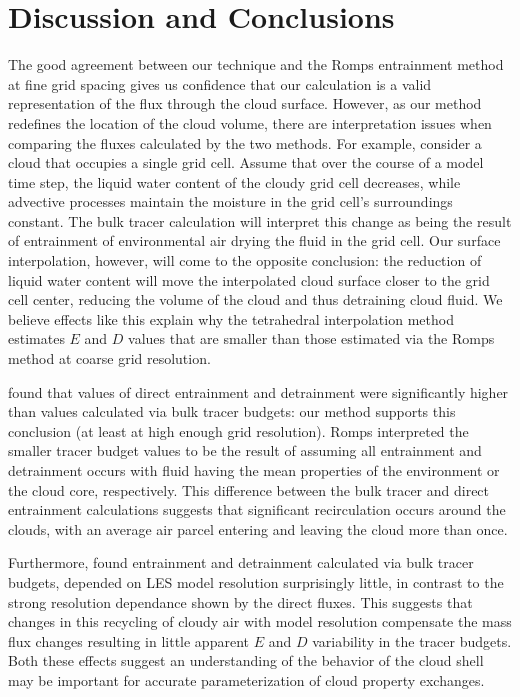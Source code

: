 \documentclass[12pt]{article}
\begin{document}

\section{Discussion and Conclusions}

The good agreement between our technique and the Romps entrainment method at
fine grid spacing gives us confidence that our calculation is a valid 
representation of the flux through the cloud surface.  However, as our 
method redefines the location of the cloud volume, there are interpretation 
issues when comparing the fluxes calculated by the two methods.  For example, 
consider a cloud that occupies a single grid cell.  Assume that over the course 
of a model time step, the liquid water content of the cloudy grid cell 
decreases, while advective processes maintain the moisture in the grid cell's 
surroundings constant.  The bulk tracer calculation will interpret this change 
as being the result of entrainment of environmental air drying the fluid in the 
grid cell.  Our surface interpolation, however, will come to the opposite 
conclusion: the reduction of liquid water content will move the interpolated 
cloud surface closer to the grid cell center, reducing the volume of the cloud 
and thus detraining cloud fluid.  We believe effects like this explain why the 
tetrahedral interpolation method estimates $E$ and $D$ values that are smaller 
than those estimated via the Romps method at coarse grid resolution.

\citet{Romps2010} found that values of direct entrainment and detrainment were 
significantly higher than values calculated via bulk tracer budgets: our 
method supports this conclusion (at least at high enough grid resolution).  
Romps interpreted the smaller tracer budget values to be the result of assuming
all entrainment and detrainment occurs with fluid having the mean properties of
the environment or the cloud core, respectively.  This difference between the 
bulk tracer and direct entrainment calculations suggests that significant 
recirculation occurs around the clouds, with an average air parcel entering 
and leaving the cloud more than once.  

Furthermore, \cite{Brown1999} found entrainment and detrainment calculated via
bulk tracer budgets, depended on LES model resolution surprisingly little, in 
contrast to the strong resolution dependance shown by the direct fluxes.
This suggests that changes in this recycling of cloudy air with model 
resolution compensate the mass flux changes resulting in little apparent $E$ 
and $D$ variability in the tracer budgets.  Both these effects suggest an 
understanding of the behavior of the cloud shell may be important for accurate
parameterization of cloud property exchanges.
\end{document}
